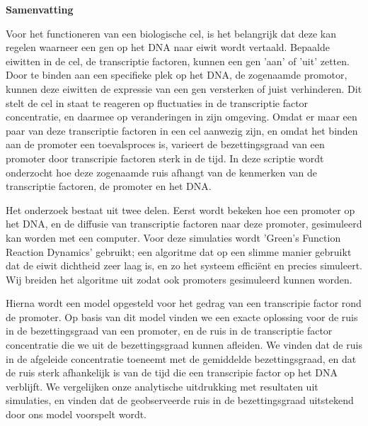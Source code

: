 \begin{center}
{\center \bf Samenvatting}
\end{center}

Voor het functioneren van een biologische cel, is het belangrijk dat deze kan regelen waarneer een gen op het DNA naar eiwit wordt vertaald. Bepaalde eiwitten in de cel, de transcriptie factoren, kunnen een gen 'aan' of 'uit' zetten. Door te binden aan een specifieke plek op het DNA, de zogenaamde promotor, kunnen deze eiwitten de expressie van een gen versterken of juist verhinderen. Dit stelt de cel in staat te reageren op fluctuaties in de transcriptie factor concentratie, en daarmee op veranderingen in zijn omgeving. Omdat er maar een paar van deze transcriptie factoren in een cel aanwezig zijn, en omdat het binden aan de promoter een toevalsproces is, varieert de bezettingsgraad van een promoter door transcripie factoren sterk in de tijd. In deze scriptie wordt onderzocht hoe deze zogenaamde ruis afhangt van de kenmerken van de transcriptie factoren, de promoter en het DNA. 

Het onderzoek bestaat uit twee delen. Eerst wordt bekeken hoe een promoter op het DNA, en de diffusie van transcriptie factoren naar deze promoter, gesimuleerd kan worden met een computer. Voor deze simulaties wordt 'Green's Function Reaction Dynamics' gebruikt; een algoritme dat op een slimme manier gebruikt dat de eiwit dichtheid zeer laag is, en zo het systeem effici\"ent en precies simuleert. Wij breiden het algoritme uit zodat ook promoters gesimuleerd kunnen worden.

Hierna wordt een model opgesteld voor het gedrag van een transcripie factor rond de promoter. Op basis van dit model vinden we een exacte oplossing voor de ruis in de bezettingsgraad van een promoter, en de ruis in de transcriptie factor concentratie die we uit de bezettingsgraad kunnen afleiden. We vinden dat de ruis in de afgeleide concentratie toeneemt met de gemiddelde bezettingsgraad, en dat de ruis sterk afhankelijk is van de tijd die een transcripie factor op het DNA verblijft. We vergelijken onze analytische uitdrukking met resultaten uit simulaties, en vinden dat de geobserveerde ruis in de bezettingsgraad uitstekend door ons model voorspelt wordt.